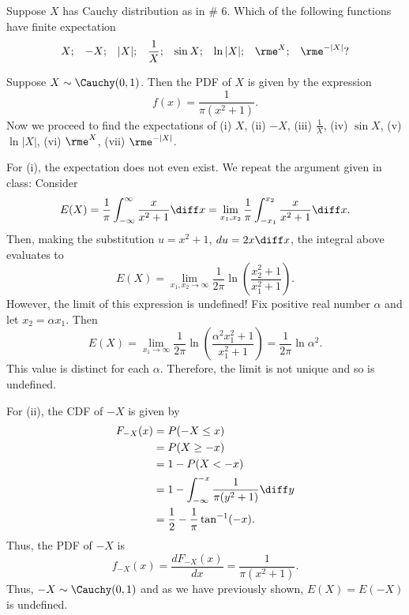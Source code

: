 \begin{problem}[Handout 13, \# 10]
  Suppose \(X\) has Cauchy distribution as in \# 6. Which of the following
  functions have finite expectation
  \[
    \begin{aligned}
      X;&&-X;&&|X|;&&\frac{1}{X};&&\sin X;&&\ln|X|;&&\rme^X;&&\rme^{-|X|}?
    \end{aligned}
  \]
\end{problem}
\begin{solution}
  Suppose \(X\sim\Cauchy(0,1)\). Then the PDF of \(X\) is given by the
  expression
  \[
    f(x)=\frac{1}{\pi(x^2+1)}.
  \]
  Now we proceed to find the expectations of (i) \(X\), (ii) \(-X\),
  (iii) \(\frac{1}{X}\), (iv) \(\sin X\), (v) \(\ln|X|\), (vi) \(\rme^X\),
  (vii) \(\rme^{{-}|X|}\).

  For (i), the expectation does not even exist. We repeat the argument
  given in class: Consider
  \[
    E(X)
    =\frac{1}{\pi}\int_{-\infty}^\infty \frac{x}{x^2+1}\diff x
    =\lim_{x_1,x_2}\frac{1}{\pi}\int_{-x_1}^{x_2}\frac{x}{x^2+1}\diff x.
  \]
  Then, making the substitution \(u=x^2+1\), \(du=2x\diff x\), the integral
  above evaluates to
  \[
    E(X)=\lim_{x_1,x_2\to\infty}\frac{1}{2\pi}\ln\left(\frac{x_2^2+1}{x_1^2+1}\right).
  \]
  However, the limit of this expression is undefined! Fix positive real
  number \(\alpha\) and let \(x_2=\alpha x_1\). Then
  \[
    E(X)=%
    \lim_{x_1\to\infty}\frac{1}{2\pi}\ln\left(\frac{\alpha^2x_1^2+1}{x_1^2+1}\right)=%
    \frac{1}{2\pi}\ln\alpha^2.
  \]
  This value is distinct for each \(\alpha\). Therefore, the limit is not
  unique and so is undefined.

  For (ii), the CDF of \(-X\) is given by
  \begin{align*}
    F_{-X}(x)
    &=P(-X\leq x)\\
    &=P(X\geq -x)\\
    &=1-P(X<-x)\\
    &=1-\int_{-\infty}^{-x}\frac{1}{\pi(y^2+1)}\diff y\\
    &=\frac{1}{2}-\frac{1}{\pi}\tan^{-1}(-x).
  \end{align*}
  Thus, the PDF of \(-X\) is
  \[
    f_{-X}(x)=\frac{dF_{-X}(x)}{dx}=\frac{1}{\pi(x^2+1)}.
  \]
  Thus, \(-X\sim\Cauchy(0,1)\) and as we have previously shown,
  \(E(X)=E(-X)\) is undefined.


\end{solution}
